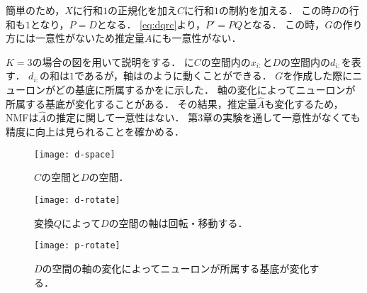 簡単のため，$X$に行和$1$の正規化を加え$C$に行和$1$の制約を加える．
この時$D$の行和も$1$となり，$P = D$となる．
\eqref{eq:dqrc}より，$P' = PQ$となる．
この時，$G$の作り方には一意性がないため推定量$A$にも一意性がない．

$K=3$の場合の図を用いて説明をする．
に$C$の空間内の$x_{i:}$と$D$の空間内の$d_{i:}$を表す．
$d_{i:}$の和は$1$であるが，軸はのように動くことができる．
$G$を作成した際にニューロンがどの基底に所属するかをに示した．
軸の変化によってニューロンが所属する基底が変化することがある．
その結果，推定量$\hat{A}$も変化するため，NMFは$\hat{A}$の推定に関して一意性はない．
第3章の実験を通して一意性がなくても精度に向上は見られることを確かめる．

\begin{figure}[htbp]
    \begin{minipage}{0.69\hsize}
			\begin{center}
					\texttt{[image: d-space]}
					\caption{$C$の空間と$D$の空間．}
					\label{fig:d-space}
			\end{center}
		\end{minipage}
    \begin{minipage}{0.3\hsize}
			\begin{center}
					\texttt{[image: d-rotate]}
					\caption{変換$Q$によって$D$の空間の軸は回転・移動する．}
					\label{fig:d-rotate}
			\end{center}
		\end{minipage}
\end{figure}
\begin{figure}[htbp]
		\begin{center}
				\texttt{[image: p-rotate]}
				\caption{$D$の空間の軸の変化によってニューロンが所属する基底が変化する．}
				\label{fig:p-rotate}
		\end{center}
\end{figure}


